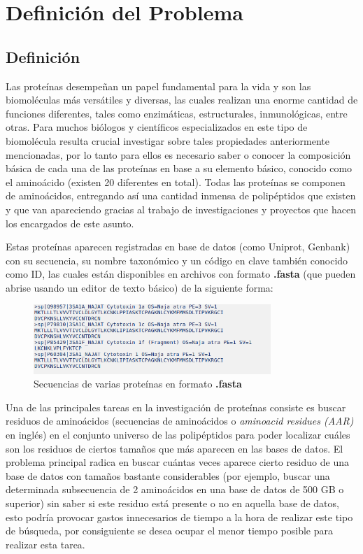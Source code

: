 \chapter{Definici\'on del Problema}

\section{Definición}

Las proteínas desempeñan un papel fundamental para la vida y son las biomoléculas más versátiles y diversas, las cuales realizan una enorme cantidad de funciones diferentes, tales como enzimáticas, estructurales, inmunológicas, entre otras. Para muchos biólogos y científicos especializados en este tipo de biomolécula resulta crucial investigar sobre tales propiedades anteriormente mencionadas, por lo tanto para ellos es necesario saber o conocer la composición básica de cada una de las proteínas en base a su elemento básico, conocido como el aminoácido (existen 20 diferentes en total). Todas las proteínas se componen de aminoácidos, entregando así una cantidad inmensa de polipéptidos que existen y que van apareciendo gracias al trabajo de investigaciones y proyectos que hacen los encargados de este asunto.

Estas proteínas aparecen registradas en base de datos (como Uniprot, Genbank) con su secuencia, su nombre taxonómico y un código en clave también conocido como ID, las cuales están disponibles en archivos con formato \textbf{.fasta} (que pueden abrise usando un editor de texto básico) de la siguiente forma:

\newpage

\begin{figure}[ht]
    \centering
    \includegraphics[width=0.8\textwidth]{./images/secuencias.png}
    \caption{Secuencias de varias proteínas en formato \textbf{.fasta}}
    \label{fig:image4}
\end{figure}

Una de las principales tareas en la investigación de proteínas consiste es buscar residuos de aminoácidos (secuencias de aminoácidos o \textit{aminoacid residues (AAR)} en inglés) en el conjunto universo de las polipéptidos para poder localizar cuáles son los residuos de ciertos tamaños que más aparecen en las bases de datos. El problema principal radica en buscar cuántas veces aparece cierto residuo de una base de datos con tamaños bastante considerables (por ejemplo, buscar una determinada subsecuencia de 2 aminoácidos en una base de datos de 500 GB o superior) sin saber si este residuo está presente o no en aquella base de datos, esto podría provocar gastos innecesarios de tiempo a la hora de realizar este tipo de búsqueda, por consiguiente se desea ocupar el menor tiempo posible para realizar esta tarea.

